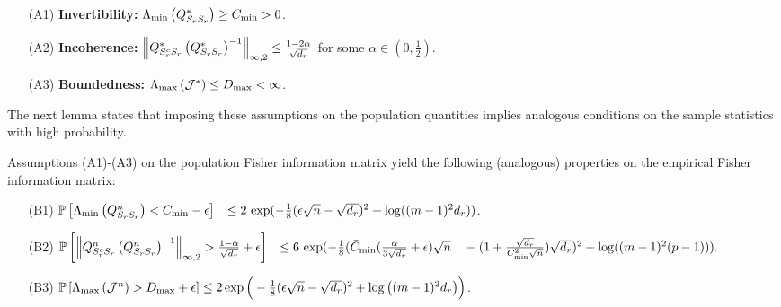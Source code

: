 \begin{itemize}
\item [(A1)] {\bf Invertibility: } $\Lambda_{\min}\left(Q^*_{S_{r}S_{r}}\right)\geq C_{\min}>0$.

\item [(A2)] {\bf Incoherence: } $\left\|Q^*_{S^c_{r}S_{r}}\left(Q^*_{S_{r}S_{r}}\right)^{-1}\right\|_{\infty,2}\leq \frac{1-2\alpha}{\sqrt{d_{r}}}$ for some $\alpha\in\left(0,\frac{1}{2}\right)$.

\item [(A3)] {\bf Boundedness: } $\Lambda_{\max}\left(\mathcal{J}^*\right)\leq D_{\max}<\infty$.\\
\end{itemize}


\noindent The next lemma states that imposing these assumptions on the population quantities implies analogous conditions on the sample statistics with high probability.
\begin{lemma}
Assumptions (A1)-(A3) on the population Fisher information matrix yield the following (analogous) properties on the empirical Fisher information matrix:
\begin{itemize}
\item [(B1)] $\mathbb{P}\left[\Lambda_{\min}\left(Q^n_{S_{r}S_{r}}\right)< C_{\min}-\epsilon\right]\\
\;\;\leq 2\,\exp(-\frac{1}{8}(\epsilon\sqrt{n}-\sqrt{d_{r}})^2+\log((m-1)^2d_{r}))$.

\item [(B2)] 
$\mathbb{P}\left[\left\|Q^n_{S^c_{r}S_{r}}\left(Q^n_{S_{r}S_{r}}\right)^{-1}\right\|_{\infty,2} > \frac{1-\alpha}{\sqrt{d_{r}}}+\epsilon\right]\\
\;\; \leq 6 \, \exp(-\frac{1}{8} (\bar{C}_{\min} (\frac{\alpha}{3\sqrt{d_{r}}} + \epsilon) \sqrt{n} \\
\quad -	(1 + \frac{\sqrt{d_{r}}}{C_{\min}^2\sqrt{n}} )  \sqrt{d_{r}})^2 + \log((m-1)^2(p-1))).
$

\item [(B3)] $\mathbb{P}\left[\Lambda_{\max}\left(\mathcal{J}^n\right)> D_{\max}+\epsilon\right]\leq 2\exp\Big(-\frac{1}{8}(\epsilon\sqrt{n}-\sqrt{d_{r}})^2+\log\big((m-1)^2d_{r}\big)\Big)$.\\
\end{itemize} 
\label{Concentration_Lemma}
\end{lemma}


